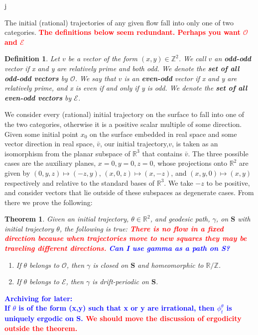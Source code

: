 j\documentclass[]{article}
\newtheorem*{thm*}{Theorem}
\newtheorem*{def*}{Definition}
\newcommand{\compav}[1]{\textbf{\textcolor{blue}{#1}}}
\newcommand{\compat}[1]{\textbf{\textcolor{red}{#1}}}
\begin{document}
The initial (rational) trajectories of any given flow fall into only one of two categories.
\compat{The definitions below seem redundant. Perhaps you want ${\mathcal O}$ and ${\mathcal E}$}

\begin{def*}
Let $v$ be a vector of the form $(x,y)\in\mathbb{Z}^{2}$. We call $v$ an \textbf{odd-odd} vector if x and y are relatively prime and both odd. We denote the \textbf{set of all odd-odd vectors} by $\mathcal{O}$. We say that $v$ is an  \textbf{even-odd} vector if x and y are relatively prime, and x is even if and only if y is odd. We denote the \textbf{set of all even-odd vectors} by $\mathcal{E}$.
\end{def*}

We consider every (rational) initial trajectory on the surface to fall into one of the two categories, otherwise it is a positive scalar multiple of some direction. Given some initial point $x_{0}$ on the surface embedded in real space and some vector direction in real space, $\bar{v}$, our initial trajectory,$v$, is taken as an isomorphism from the planar subspace of $\mathbb{R}^{3}$ that contains $\bar{v}$. The three possible cases are the auxiliary planes, $x=0, y=0, z=0$, whose projections onto $\mathbb{R}^{2}$ are given by $(0,y,z)\mapsto(-z,y)$, $(x,0,z)\mapsto(x,-z)$, and $(x,y,0)\mapsto(x,y)$ respectively and relative to the standard bases of $\mathbb{R}^{3}$. We take $-z$ to be positive, and consider vectors that lie outside of these subspaces as degenerate cases. From there we prove the following:

\begin{thm*}{Given an initial trajectory, $\theta\in\mathbb{R}^{2}$, and geodesic path, $\gamma$, on $\mathbf{S}$ with initial trajectory $\theta$, the following is true:} \compat{There is no flow in a fixed direction because when trajectories move to new squares they may be traveling different directions.}
\compav{Can I use gamma as a path on S?}
\begin{enumerate}[label=(\roman*)]
\item If $\theta$ belongs to $\mathcal{O}$, then $\gamma$ is closed on $\mathbf{S}$ and homeomorphic to $\mathbb{R}/\mathbb{Z}$.
\item If $\theta$ belongs to $\mathcal{E}$, then $\gamma$ is drift-periodic on $\mathbf{S}$.

\end{enumerate}
\end{thm*}

\compav{Archiving for later:\\If $\theta$ is of the form (x,y) such that x or y are irrational, then $\phi^{\theta}_{t}$ is uniquely ergodic on $\mathbf{S}$. \compat{We should move the discussion of ergodicity outside the theorem.}	}
\end{document}
